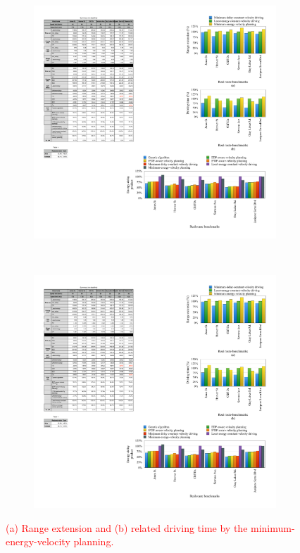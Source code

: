 \documentclass{IEEEtran}
\begin{document}
\begin{figure}   %
\centering
	\begin{subfigure}{0.4\textwidth}
	\includegraphics[width=\hsize]{Figures/range_comp_bar.pdf}
	\caption{}
	\label{fig:range_comp}
	\end{subfigure}
~
	\begin{subfigure}{0.4\textwidth}
	\includegraphics[width=\hsize]{Figures/driving_time_comp_bar.pdf}
	\caption{}
	\label{fig:driving_time_comp}
	\end{subfigure}
\caption{\textcolor{red}{(a) Range extension and (b) related driving time by the minimum-energy-velocity planning.}}
\label{fig:min_energy_planning_comp}
\end{figure}
\end{document}
